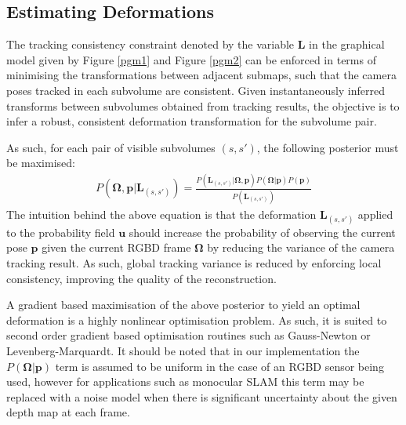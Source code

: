 \subsection{Estimating Deformations}
The tracking consistency constraint denoted by the variable $\mathbf{L}$ in the graphical model given by Figure \ref{pgm1} and Figure \ref{pgm2} can 
be enforced in terms of minimising the transformations between adjacent submaps, such that the camera poses tracked in each subvolume are consistent.  
Given instantaneously inferred transforms between subvolumes obtained from tracking results, 
the objective is to infer a robust, consistent deformation transformation for the subvolume pair.

As such, for each pair of visible subvolumes $(s, s')$, the following posterior must be maximised:
\begin{equation}
\begin{split}
P(\mathbf{\Omega}, \mathbf{p} | \mathbf{L}_{(s, s')}) = \frac{P(\mathbf{L}_{(s, s')} | \mathbf{\Omega}, \mathbf{p}) P(\mathbf{\Omega} | \mathbf{p})P(\mathbf{p})}
{P(\mathbf{L}_{(s, s')})}
\end{split}
\end{equation}
The intuition behind the above equation is that the deformation $\mathbf{L}_{(s, s')}$ applied to the probability field $\mathbf{u}$ should 
increase the probability of observing the current pose $\mathbf{p}$ given the current RGBD frame $\mathbf{\Omega}$ by reducing the 
variance of the camera tracking result. As such, global tracking variance is reduced by enforcing local consistency, improving the quality 
of the reconstruction.

A gradient based maximisation of the above posterior to yield an optimal deformation is a highly nonlinear optimisation problem. As such, it is suited 
to second order gradient based optimisation routines such as Gauss-Newton or Levenberg-Marquardt.
It should be noted that in our implementation the $P(\mathbf{\Omega} | \mathbf{p})$ term is assumed to be uniform in the case of an 
RGBD sensor being used, however for applications such as monocular SLAM this term may be replaced with a noise model when there is 
significant uncertainty about the given depth map at each frame.

